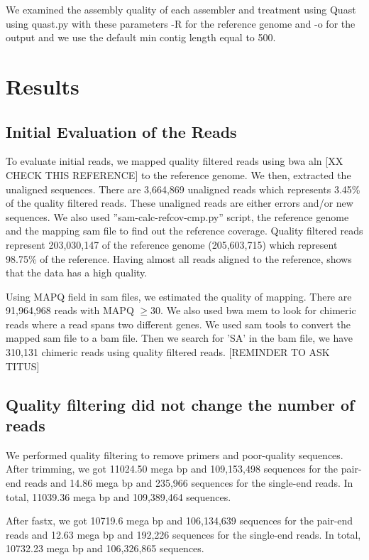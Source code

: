 We examined the assembly quality of each assembler and treatment using Quast \cite{quast} using quast.py  with these parameters -R for the reference genome and -o for the output and we use the default min contig length equal to 500. 



\section*{Results}


\subsection*{Initial Evaluation of the Reads}
To evaluate initial reads, we mapped quality filtered reads using bwa aln \cite{bwa-mem} [XX CHECK THIS REFERENCE] to the reference genome. We then, extracted the unaligned sequences. There are 3,664,869 unaligned reads which represents 3.45\% of the quality filtered reads. These unaligned reads are either errors and/or new sequences.  We also used ”sam-calc-refcov-cmp.py” script, the reference genome and the mapping  sam file to find out the reference coverage. Quality filtered reads  represent 203,030,147  of the reference genome (205,603,715) which represent 98.75\%  of the reference. Having almost all reads aligned to the reference, shows that the data has a high quality. 

Using MAPQ field in sam files, we estimated the quality of mapping. There are 91,964,968 reads with MAPQ $\geq 30$. 
We also used bwa mem  \cite{bwa-mem} to look for chimeric reads where a read spans two different genes. We used sam tools to convert the mapped sam file to a bam file. Then we search for ’SA’ in the bam file, we have 310,131 chimeric reads using quality filtered reads. 
[REMINDER TO ASK TITUS]
\subsection*{Quality filtering did not change the number of reads}            
We performed quality filtering to remove primers and poor-quality sequences. After trimming, we got 11024.50 mega bp and 109,153,498 sequences for the pair-end reads and 14.86 mega bp and 235,966 sequences for the single-end reads. In total,  11039.36 mega bp and 109,389,464 sequences. 


After fastx, we got 10719.6 mega bp and  106,134,639 sequences for the pair-end reads and 12.63  mega bp and  192,226 sequences for the single-end reads. In total, 10732.23 mega bp and 106,326,865 sequences. 

